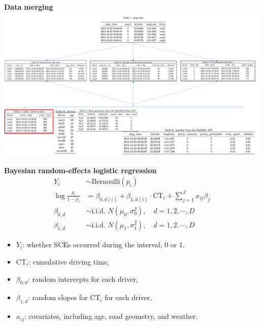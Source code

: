 \begin{frame}{\textbf{Data merging}}
\centering
  \includegraphics[width=\textwidth, height = \textheight, keepaspectratio, frame]{Figures/flow_chart.png}
\end{frame}

\begin{frame}{\textbf{Bayesian random-effects logistic regression}}
\begin{equation}\label{eq:logit}
\begin{split}
Y_{i} &\sim \text{Bernoulli}(p_{i})\\
\log\frac{p_{i}}{1-p_{i}} &= \beta_{0, d(i)} + \beta_{1, d(i)} \cdot \text{CT}_i + \sum_{j=1}^{J} x_{ij}\beta_j\\
\beta_{0, d} &\sim \text{i.i.d. } N(\mu_0, \sigma_0^2), \quad d = 1, 2, \cdots, D\\
\beta_{1, d} &\sim \text{i.i.d. } N(\mu_1, \sigma_1^2), \quad d = 1, 2, \cdots, D
\end{split}
\end{equation}
\begin{itemize}
    \item $Y_i$: whether SCEs occurred during the interval, 0 or 1,
    \item CT$_i$: cumulative driving time,
    \item $\beta_{0, d}$: random intercepts for each driver,
    \item $\beta_{1, d}$: random slopes for CT$_i$ for each driver,
    \item $x_{ij}$: covariates, including age, road geometry, and weather.
\end{itemize}
\end{frame}


